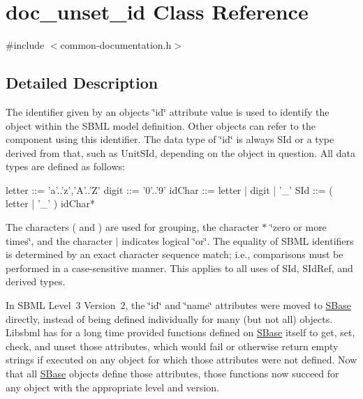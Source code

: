 \hypertarget{classdoc__unset__id}{}\section{doc\+\_\+unset\+\_\+id Class Reference}
\label{classdoc__unset__id}


{\ttfamily \#include $<$common-\/documentation.\+h$>$}



\subsection{Detailed Description}
\begin{DoxyParagraph}{}
The identifier given by an object\textquotesingle{}s \char`\"{}id\char`\"{} attribute value is used to identify the object within the S\+B\+ML model definition. Other objects can refer to the component using this identifier. The data type of \char`\"{}id\char`\"{} is always {\ttfamily S\+Id} or a type derived from that, such as {\ttfamily Unit\+S\+Id}, depending on the object in question. All data types are defined as follows\+: 
\begin{DoxyPre}
     letter ::= 'a'..'z','A'..'Z'
     digit  ::= '0'..'9'
     idChar ::= letter | digit | '\_'
     SId    ::= ( letter | '\_' ) idChar*
   \end{DoxyPre}

\end{DoxyParagraph}
The characters {\ttfamily (} and {\ttfamily )} are used for grouping, the character {\ttfamily $\ast$} \char`\"{}zero or more times\char`\"{}, and the character {\ttfamily $\vert$} indicates logical \char`\"{}or\char`\"{}. The equality of S\+B\+ML identifiers is determined by an exact character sequence match; i.\+e., comparisons must be performed in a case-\/sensitive manner. This applies to all uses of {\ttfamily S\+Id}, {\ttfamily S\+Id\+Ref}, and derived types.

In S\+B\+ML Level~3 Version~2, the \char`\"{}id\char`\"{} and \char`\"{}name\char`\"{} attributes were moved to \hyperlink{class_s_base}{S\+Base} directly, instead of being defined individually for many (but not all) objects. Libsbml has for a long time provided functions defined on \hyperlink{class_s_base}{S\+Base} itself to get, set, check, and unset those attributes, which would fail or otherwise return empty strings if executed on any object for which those attributes were not defined. Now that all \hyperlink{class_s_base}{S\+Base} objects define those attributes, those functions now succeed for any object with the appropriate level and version.

